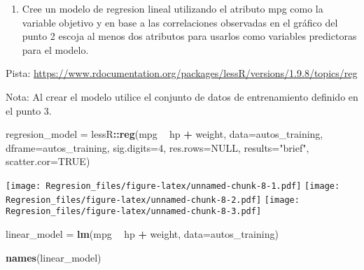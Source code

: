 \documentclass[]{article}
\newenvironment{Shaded}{\begin{snugshade}}{\end{snugshade}}
\newcommand{\DataTypeTok}[1]{\textcolor[rgb]{0.13,0.29,0.53}{#1}}
\newcommand{\DecValTok}[1]{\textcolor[rgb]{0.00,0.00,0.81}{#1}}
\newcommand{\KeywordTok}[1]{\textcolor[rgb]{0.13,0.29,0.53}{\textbf{#1}}}
\newcommand{\NormalTok}[1]{#1}
\newcommand{\OperatorTok}[1]{\textcolor[rgb]{0.81,0.36,0.00}{\textbf{#1}}}
\newcommand{\OtherTok}[1]{\textcolor[rgb]{0.56,0.35,0.01}{#1}}
\newcommand{\StringTok}[1]{\textcolor[rgb]{0.31,0.60,0.02}{#1}}
\providecommand{\tightlist}{%
  \setlength{\itemsep}{0pt}\setlength{\parskip}{0pt}}
\begin{document}
\begin{enumerate}
\def\labelenumi{\arabic{enumi}.}
\setcounter{enumi}{3}
\tightlist
\item
  Cree un modelo de regresion lineal utilizando el atributo mpg como la
  variable objetivo y en base a las correlaciones observadas en el
  gráfico del punto 2 escoja al menos dos atributos para usarlos como
  variables predictoras para el modelo.
\end{enumerate}

Pista:
\url{https://www.rdocumentation.org/packages/lessR/versions/1.9.8/topics/reg}

Nota: Al crear el modelo utilice el conjunto de datos de entrenamiento
definido en el punto 3.

\begin{Shaded}
\begin{Highlighting}[]
\NormalTok{regresion_model =}\StringTok{ }\NormalTok{lessR}\OperatorTok{::}\KeywordTok{reg}\NormalTok{(mpg }\OperatorTok{~}\StringTok{ }\NormalTok{hp }\OperatorTok{+}\StringTok{ }\NormalTok{weight, }
           \DataTypeTok{data=}\NormalTok{autos_training, }\DataTypeTok{dframe=}\NormalTok{autos_training, }
           \DataTypeTok{sig.digits=}\DecValTok{4}\NormalTok{, }\DataTypeTok{res.rows=}\OtherTok{NULL}\NormalTok{, }\DataTypeTok{results=}\StringTok{"brief"}\NormalTok{, }\DataTypeTok{scatter.cor=}\OtherTok{TRUE}\NormalTok{)}
\end{Highlighting}
\end{Shaded}

\texttt{[image: Regresion\_files/figure-latex/unnamed-chunk-8-1.pdf]}
\texttt{[image: Regresion\_files/figure-latex/unnamed-chunk-8-2.pdf]}
\texttt{[image: Regresion\_files/figure-latex/unnamed-chunk-8-3.pdf]}

\begin{Shaded}
\begin{Highlighting}[]
\NormalTok{linear_model =}\StringTok{ }\KeywordTok{lm}\NormalTok{(mpg }\OperatorTok{~}\StringTok{ }\NormalTok{hp }\OperatorTok{+}\StringTok{ }\NormalTok{weight, }
           \DataTypeTok{data=}\NormalTok{autos_training)}
\end{Highlighting}
\end{Shaded}

\begin{Shaded}
\begin{Highlighting}[]
\KeywordTok{names}\NormalTok{(linear_model)}
\end{Highlighting}
\end{Shaded}
\end{document}
